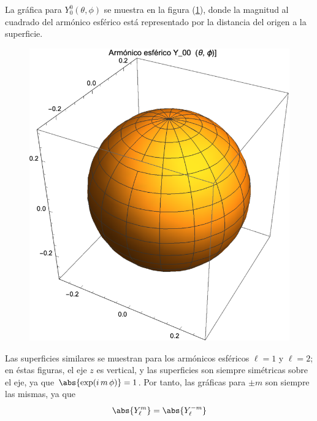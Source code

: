 La gráfica para $Y_{0}^{0} (\theta, \phi)$ se muestra en la figura (\ref{fig:armonico_esferico_00}), donde la magnitud al cuadrado del armónico esférico está representado por la distancia del origen a la superficie.
\begin{figure}[H]
    \centering
    \includegraphics[scale=1]{Imagenes/Armonicos_Esfericos_00.eps}
    \label{fig:armonico_esferico_00}
\end{figure}
Las superficies similares se muestran para los armónicos esféricos $\ell = 1$ y $\ell = 2$; en éstas figuras, el eje $z$ es vertical, y las superficies son siempre simétricas sobre el eje, ya que $\abs{\exp(i \, m \, \phi)} = 1$. Por tanto, las gráficas para $\pm m$ son siempre las mismas, ya que
\begin{align*}
\abs{Y_{\ell}^{m}} = \abs{Y_{\ell}^{-m}}
\end{align*}

